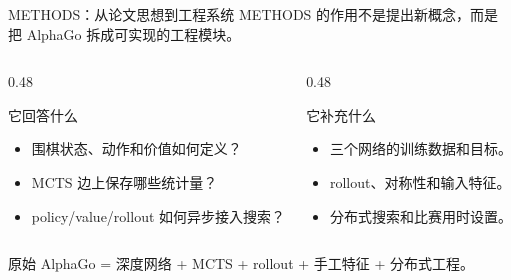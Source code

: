 \documentclass[UTF8,aspectratio=169,10pt]{ctexbeamer}
\begin{document}
\begin{frame}{METHODS：从论文思想到工程系统}
  METHODS 的作用不是提出新概念，而是把 AlphaGo 拆成可实现的工程模块。

  \vspace{0.12cm}
  \begin{columns}[T,onlytextwidth]
    \begin{column}{0.48\textwidth}
      \begin{block}{它回答什么}
        \begin{itemize}
          \item 围棋状态、动作和价值如何定义？
          \item MCTS 边上保存哪些统计量？
          \item policy/value/rollout 如何异步接入搜索？
        \end{itemize}
      \end{block}
    \end{column}
    \begin{column}{0.48\textwidth}
      \begin{block}{它补充什么}
        \begin{itemize}
          \item 三个网络的训练数据和目标。
          \item rollout、对称性和输入特征。
          \item 分布式搜索和比赛用时设置。
        \end{itemize}
      \end{block}
    \end{column}
  \end{columns}

  \vspace{0.2cm}
  \begin{center}
    \large
    原始 AlphaGo = 深度网络 + MCTS + rollout + 手工特征 + 分布式工程。
  \end{center}
\end{frame}
\end{document}
